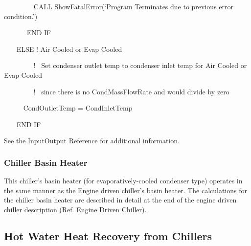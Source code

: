 ~~~~~~~~ CALL ShowFatalError(`Program Terminates due to previous error condition.')

~~~~~~ END IF

~~~ ELSE ! Air Cooled or Evap Cooled

~~~~~~~~ !~ Set condenser outlet temp to condenser inlet temp for Air Cooled or Evap Cooled

~~~~~~~~ !~ since there is no CondMassFlowRate and would divide by zero

~~~~~ CondOutletTemp = CondInletTemp

~~~ END IF

See the InputOutput Reference for additional information.

\subsubsection{Chiller Basin Heater}\label{chiller-basin-heater-1}

This chiller's basin heater (for evaporatively-cooled condenser type) operates in the same manner as the Engine driven chiller's basin heater. The calculations for the chiller basin heater are described in detail at the end of the engine driven chiller description (Ref. Engine Driven Chiller).

\subsection{Hot Water Heat Recovery from Chillers}\label{hot-water-heat-recovery-from-chillers}

